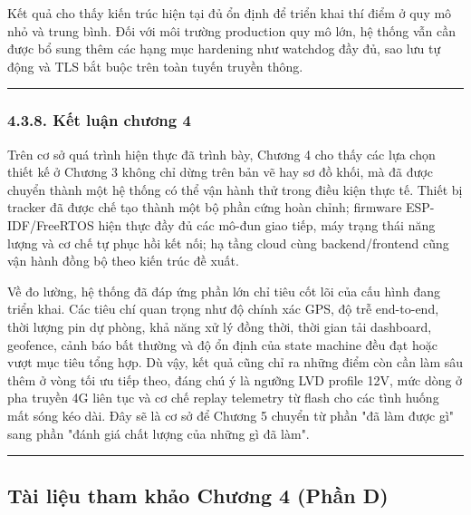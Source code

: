 \documentclass[a4paper]{extarticle}
\begin{document}
Kết quả cho thấy kiến trúc hiện tại đủ ổn định để triển khai thí điểm ở
quy mô nhỏ và trung bình. Đối với môi trường production quy mô lớn, hệ
thống vẫn cần được bổ sung thêm các hạng mục hardening như watchdog đầy
đủ, sao lưu tự động và TLS bắt buộc trên toàn tuyến truyền thông.

\begin{center}\rule{0.5\linewidth}{0.5pt}\end{center}

\subsubsection{4.3.8. Kết luận chương
4}\label{438-kux1ebft-luux1eadn-chux1b0ux1a1ng-4}

Trên cơ sở quá trình hiện thực đã trình bày, Chương 4 cho thấy các lựa
chọn thiết kế ở Chương 3 không chỉ dừng trên bản vẽ hay sơ đồ khối, mà
đã được chuyển thành một hệ thống có thể vận hành thử trong điều kiện
thực tế. Thiết bị tracker đã được chế tạo thành một bộ phần cứng hoàn
chỉnh; firmware ESP-IDF/FreeRTOS hiện thực đầy đủ các mô-đun giao tiếp,
máy trạng thái năng lượng và cơ chế tự phục hồi kết nối; hạ tầng cloud
cùng backend/frontend cũng vận hành đồng bộ theo kiến trúc đề xuất.

Về đo lường, hệ thống đã đáp ứng phần lớn chỉ tiêu cốt lõi của cấu hình
đang triển khai. Các tiêu chí quan trọng như độ chính xác GPS, độ trễ
end-to-end, thời lượng pin dự phòng, khả năng xử lý đồng thời, thời gian
tải dashboard, geofence, cảnh báo bất thường và độ ổn định của state
machine đều đạt hoặc vượt mục tiêu tổng hợp. Dù vậy, kết quả cũng chỉ ra
những điểm còn cần làm sâu thêm ở vòng tối ưu tiếp theo, đáng chú ý là
ngưỡng LVD profile 12V, mức dòng ở pha truyền 4G liên tục và cơ chế
replay telemetry từ flash cho các tình huống mất sóng kéo dài. Đây sẽ là
cơ sở để Chương 5 chuyển từ phần "đã làm được gì" sang phần "đánh giá
chất lượng của những gì đã làm".

\begin{center}\rule{0.5\linewidth}{0.5pt}\end{center}

\subsection{Tài liệu tham khảo Chương 4 (Phần
D)}\label{tuxe0i-liux1ec7u-tham-khux1ea3o-chux1b0ux1a1ng-4-phux1ea7n-d}
\end{document}
